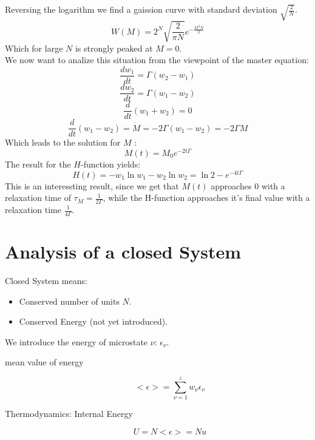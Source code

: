 \documentclass{report}
\begin{document}
Reversing the logarithm we find a gaission curve with standard deviation $\sqrt{\frac{2}{N}}$. \[
  W(M) = 2^N \sqrt{\frac{2}{\pi N}} e^{-\frac{M^2 N}{2}}
\] Which for large $N$ is strongly peaked at $M = 0$.\\
We now want to analize this situation from the viewpoint of the master equation: \[
  \frac{dw_1}{dt} = \Gamma \left( w_2 - w_1 \right) 
\] \[
\frac{dw_2}{dt} = \Gamma \left( w_1 - w_2 \right) 
\] \[
\frac{d}{dt} \left( w_1 + w_2 \right) = 0
\] \[
\frac{d}{dt} \left( w_1 - w_2 \right) = \dot{M} = -2\Gamma \left( w_1 - w_2 \right) = -2 \Gamma M
\] Which leads to the solution for $M$ : \[
M(t) = M_0 e^{-2t\Gamma}
\] 
The result for the $H$-function yields: \[
  H(t) = - w_1 \ln w_1 - w_2 \ln w_2 = \ln 2 - e^{-4t \Gamma}
\] 
This is an interessting result, since we get that $M(t)$ approaches $0$ with a relaxation time of $\tau_M = \frac{1}{2 \Gamma}$, while the H-function approaches it's final value with a relaxation time $\frac{1}{4 \Gamma}$.

\section{Analysis of a closed System}
Closed System means:
\begin{itemize}
  \item Conserved number of units $N$.
  \item Conserved Energy (not yet introduced).
\end{itemize}
We introduce the energy of microstate $\nu$: $\epsilon_\nu$. 
\begin{description}
  \item[mean value of energy] \[
  <\epsilon> = \sum_{\nu=1}^{z} w_\nu \epsilon_\nu
  \] 
\item[Thermodynamics: Internal Energy] \[
U = N <\epsilon> = N u
\] 
\end{description}
\end{document}
